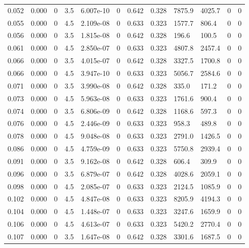 \documentclass[preview]{standalone}
\begin{document}
{{\begin{tabular}{L{1.2cm}C{1.2cm} C{0.3cm}C{0.5cm} C{1.4cm}C{1.4cm} C{1.4cm}C{1.4cm} C{1.6cm}C{1.6cm} C{1.6cm}C{1.6cm}}
  0.052  &  0.000  & 0     & 3.5 &  6.007e-10  & 0  &  0.642&   0.328& 7875.9 & 4025.7   &  0 & 0  \\ 
  0.055  &  0.000  & 0     & 4.5 &  2.109e-08  & 0  &  0.633&   0.323& 1577.7 & 806.4   &  0 & 0  \\ 
  0.056  &  0.000  & 0     & 3.5 &  1.815e-08  & 0  &  0.642&   0.328& 196.6 & 100.5   &  0 & 0  \\ 
  0.061  &  0.000  & 0     & 4.5 &  2.850e-07  & 0  &  0.633&   0.323& 4807.8 & 2457.4   &  0 & 0  \\ 
  0.066  &  0.000  & 0     & 3.5 &  4.015e-07  & 0  &  0.642&   0.328& 3327.5 & 1700.8   &  0 & 0  \\ 
  0.066  &  0.000  & 0     & 4.5 &  3.947e-10  & 0  &  0.633&   0.323& 5056.7 & 2584.6   &  0 & 0  \\ 
  0.071  &  0.000  & 0     & 3.5 &  3.990e-08  & 0  &  0.642&   0.328& 335.0 & 171.2   &  0 & 0  \\ 
  0.073  &  0.000  & 0     & 4.5 &  5.963e-08  & 0  &  0.633&   0.323& 1761.6 & 900.4   &  0 & 0  \\ 
  0.074  &  0.000  & 0     & 3.5 &  6.806e-09  & 0  &  0.642&   0.328& 1168.6 & 597.3   &  0 & 0  \\ 
  0.076  &  0.000  & 0     & 4.5 &  2.446e-09  & 0  &  0.633&   0.323& 958.3 & 489.8   &  0 & 0  \\ 
  0.078  &  0.000  & 0     & 4.5 &  9.048e-08  & 0  &  0.633&   0.323& 2791.0 & 1426.5   &  0 & 0  \\ 
  0.086  &  0.000  & 0     & 4.5 &  4.759e-09  & 0  &  0.633&   0.323& 5750.8 & 2939.4   &  0 & 0  \\ 
  0.091  &  0.000  & 0     & 3.5 &  9.162e-08  & 0  &  0.642&   0.328& 606.4 & 309.9   &  0 & 0  \\ 
  0.096  &  0.000  & 0     & 3.5 &  6.879e-07  & 0  &  0.642&   0.328& 4028.6 & 2059.1   &  0 & 0  \\ 
  0.098  &  0.000  & 0     & 4.5 &  2.085e-07  & 0  &  0.633&   0.323& 2124.5 & 1085.9   &  0 & 0  \\ 
  0.102  &  0.000  & 0     & 4.5 &  4.847e-08  & 0  &  0.633&   0.323& 8205.9 & 4194.3   &  0 & 0  \\ 
  0.104  &  0.000  & 0     & 4.5 &  1.448e-07  & 0  &  0.633&   0.323& 3247.6 & 1659.9   &  0 & 0  \\ 
  0.106  &  0.000  & 0     & 4.5 &  4.613e-07  & 0  &  0.633&   0.323& 5420.2 & 2770.4   &  0 & 0  \\ 
  0.107  &  0.000  & 0     & 3.5 &  1.647e-08  & 0  &  0.642&   0.328& 3301.6 & 1687.5   &  0 & 0  \\ 

\end{tabular}}}
\end{document}
